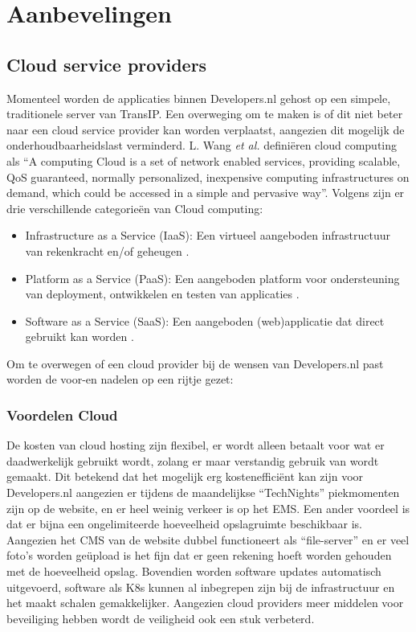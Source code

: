 \chapter{Aanbevelingen}

\label{Chapter8}

\section{Cloud service providers}
Momenteel worden de applicaties binnen Developers.nl gehost op een simpele, traditionele server van TransIP. Een overweging om te maken is of dit niet beter naar een cloud service provider kan worden verplaatst, aangezien dit mogelijk de onderhoudbaarheidslast verminderd. L. Wang \textit{et al.} \parencite{CloudPerspective} definiëren cloud computing als \enquote{A computing Cloud is a set of network enabled services, providing scalable, QoS guaranteed, normally personalized, inexpensive computing infrastructures on demand, which could be accessed in a simple and pervasive way}. Volgens \parencite{CloudPlatformsIntroduction} zijn er drie verschillende categorieën van Cloud computing:
\begin{itemize}
	\item Infrastructure as a Service (IaaS): Een virtueel aangeboden infrastructuur van rekenkracht en/of geheugen \parencite{CloudComputingAdvantages}.
	\item Platform as a Service (PaaS): Een aangeboden platform voor ondersteuning van deployment, ontwikkelen en testen van applicaties \parencite{TransformingCloud}.
	\item Software as a Service (SaaS): Een aangeboden (web)applicatie dat direct gebruikt kan worden \parencite{CloudComputingAdvantages}.
\end{itemize}

Om te overwegen of een cloud provider bij de wensen van Developers.nl past worden de voor-en nadelen op een rijtje gezet:
\subsection{Voordelen Cloud}
De kosten van cloud hosting zijn flexibel, er wordt alleen betaalt voor wat er daadwerkelijk gebruikt wordt, zolang er maar verstandig gebruik van wordt gemaakt. Dit betekend dat het mogelijk erg kostenefficiënt kan zijn voor Developers.nl aangezien er tijdens de maandelijkse \enquote{TechNights} piekmomenten zijn op de website, en er heel weinig verkeer is op het EMS. Een ander voordeel is dat er bijna een ongelimiteerde hoeveelheid opslagruimte beschikbaar is. Aangezien het CMS van de website dubbel functioneert als \enquote{file-server} en er veel foto's worden geüpload is het fijn dat er geen rekening hoeft worden gehouden met de hoeveelheid opslag. Bovendien worden software updates automatisch uitgevoerd, software als K8s kunnen al inbegrepen zijn bij de infrastructuur en het maakt schalen gemakkelijker. Aangezien cloud providers meer middelen voor beveiliging hebben wordt de veiligheid ook een stuk verbeterd.

